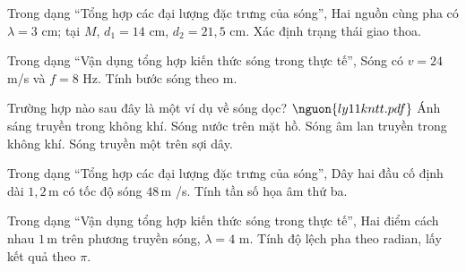 \begin{ex}
Trong dạng “Tổng hợp các đại lượng đặc trưng của sóng”, Hai nguồn cùng pha có $\lambda=3$ cm; tại $M$, $d_1=14$ cm, $d_2=21,5$ cm. Xác định trạng thái giao thoa.
\choiceTF

\end{ex}

\begin{ex}
Trong dạng “Vận dụng tổng hợp kiến thức sóng trong thực tế”, Sóng có $v=24$ m/s và $f=8$ Hz. Tính bước sóng theo m.
\end{ex}

\begin{ex}
Trường hợp nào sau đây là một ví dụ về sóng dọc? $\nguon{ly11 kntt.pdf}$
\choice
{Ánh sáng truyền trong không khí.}
{Sóng nước trên mặt hồ.}
{\True Sóng âm lan truyền trong không khí.}
{Sóng truyền một trên sợi dây.}
\end{ex}

\begin{bt}
Trong dạng “Tổng hợp các đại lượng đặc trưng của sóng”, Dây hai đầu cố định dài $1,2\,\text{m}$ có tốc độ sóng $48\,\text{m}$ /s. Tính tần số họa âm thứ ba.
\end{bt}

\begin{ex}
Trong dạng “Vận dụng tổng hợp kiến thức sóng trong thực tế”, Hai điểm cách nhau $1\,\text{m}$ trên phương truyền sóng, $\lambda=4$ m. Tính độ lệch pha theo radian, lấy kết quả theo $\pi$.
\end{ex}

